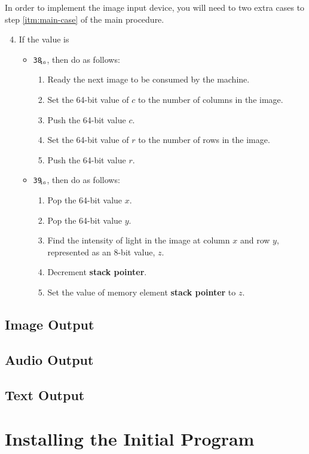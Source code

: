 \documentclass[a4paper,11pt]{article}
\newcommand{\SP}{\textbf{stack pointer}\xspace}
\newcommand{\num}[1]{\texttt{#1}\xspace}
\newcommand{\hex}[1]{\num{#1}$_{\textup{\tiny\hskip-1ex 16}}$\xspace}
\begin{document}
In order to implement the image input device, you will need to two extra cases to step \ref{itm:main-case} of the main procedure.

\begin{enumerate}
  \setcounter{enumi}{3}
\item If the value is
  \begin{itemize}
  \item \hex{38}, then do as follows:
    \begin{enumerate}
    \item Ready the next image to be consumed by the machine.
    \item Set the 64-bit value of $c$ to the number of columns in the image.
    \item Push the 64-bit value $c$.
    \item Set the 64-bit value of $r$ to the number of rows in the image.
    \item Push the 64-bit value $r$.
    \end{enumerate}
  \item \hex{39}, then do as follows:
    \begin{enumerate}
    \item Pop the 64-bit value $x$.
    \item Pop the 64-bit value $y$.
    \item Find the intensity of light in the image at column $x$ and row $y$, represented as an 8-bit value, $z$.
    \item Decrement \SP.
    \item Set the value of memory element \SP to $z$.
    \end{enumerate}
  \end{itemize}
\end{enumerate}

\subsection{Image Output}

\subsection{Audio Output}

\subsection{Text Output}

\section{Installing the Initial Program}
\end{document}
